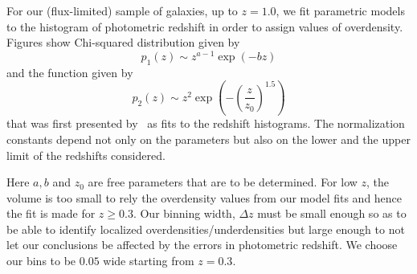 \documentclass[twocolumn,useAMS,usenatbib]{mn2e}
\newcommand{\rachel}[1]{}
\newcommand{\arun}[1]{}
\begin{document}
For our (flux-limited) sample of galaxies, up to $z=1.0$, we fit parametric models to the histogram of photometric redshift in order to assign values of overdensity. Figures show Chi-squared distribution given by
\begin{equation}
 p_1(z) \sim z^{a-1}\exp({-bz})
\end{equation}
and the function given by
\begin{equation}
 p_2(z) \sim z^2\exp{\left(-\left(\frac{z}{z_0}\right)^{1.5}\right)}
\end{equation}
that was first presented by~\cite{Redshift_modelling} as fits to the
redshift histograms. The normalization constants depend not only on the parameters but also on the lower and the upper limit of the redshifts considered. 
\rachel{(To avoid ambiguity, you should use avoid   using the same symbol in both equations.  For example you could turn   the $b$'s into $b_1$ and $b_2$.  Also, the normalization factors out  front do not matter - they are not something that you fit for.  I would say $p(z)\propto$\dots to avoid   the need for a normalization for which you are not actually fitting.)} 
\arun{Done.}
Here $a,b$ and $z_0$ are free parameters that are to be determined.
For low $z$, the volume is too small to rely the overdensity values from our model fits and hence the fit is made for $z \ge 0.3$. Our binning width, $\Delta z$ must be small enough so as to be able to identify localized overdensities/underdensities but large enough to not let our conclusions be affected by the errors in photometric redshift. 
We choose our bins to be $0.05$ wide starting from $z=0.3$. 

\end{document}
